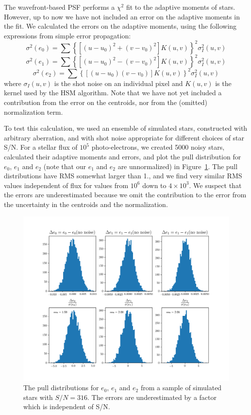 \documentclass[\docopts]{\docclass}
\begin{document}
The wavefront-based PSF performs a $\chi^2$ fit to the adaptive moments of stars.  However, up to now we have not included an error on the adaptive moments in the fit.  We calculated the errors on the adaptive moments, using the following expressions from simple error propagation:
$$  \sigma^2(e_0) = \sum \left\{ \left[ (u-u_0)^2 + (v-v_0)^2  \right] K(u,v) \right\}^2 \sigma_{I}^2(u,v) $$
$$  \sigma^2(e_1) = \sum \left\{ \left[ (u-u_0)^2 - (v-v_0)^2  \right] K(u,v) \right\}^2 \sigma_{I}^2(u,v) $$
$$  \sigma^2(e_2) = \sum \left\{ \left[ (u-u_0)  (v-v_0)  \right] K(u,v) \right\}^2 \sigma_{I}^2(u,v) $$
where $\sigma_{I}(u,v)$ is the shot noise on an individual pixel and $K(u,v)$ is the kernel used by the HSM algorithm. Note that we have not yet included a contribution from the error on the centroids, nor from the (omitted) normalization term. 

To test this calculation, we used an ensemble of simulated stars, constructed with arbitrary aberration, and with shot noise appropriate for different choices of star S/N. For a stellar flux of $10^5$ photo-electrons, we created 5000 noisy stars, calculated their adaptive moments and errors, and plot the pull distribution for $e_0$, $e_1$ and $e_2$ (note that our $e_1$ and $e_2$ are unnormalized) in Figure~\ref{fig:momerror}.  The pull distributions have RMS  somewhat larger than 1., and we find very similar RMS values independent of flux for values from $10^6$ down to $4\times10^3$.  We suspect that the errors are underestimated because we omit the contribution to the error from the uncertainty in the centroids and the normalization.  


\begin{figure}[h]
\includegraphics[width=0.9\columnwidth]{moment-errors-flux1e5.png}
\caption{The pull distributions for $e_0$, $e_1$ and $e_2$ from a sample of simulated stars with $S/N = 316$. The errors are underestimated by a factor which is independent of S/N. \label{fig:momerror}}
\end{figure}
\end{document}
